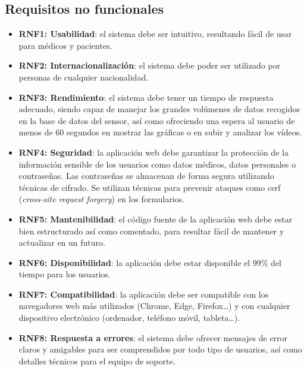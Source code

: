 \subsection{Requisitos no funcionales}
\begin{itemize}
    \item \textbf{RNF1: Usabilidad}: el sistema debe ser intuitivo, resultando fácil de usar para médicos y pacientes. 

    \item \textbf{RNF2: Internacionalización}: el sistema debe poder ser utilizado por personas de cualquier nacionalidad.

    \item \textbf{RNF3: Rendimiento}: el sistema debe tener un tiempo de respuesta adecuado, siendo capaz de manejar los grandes volúmenes de datos recogidos en la base de datos del sensor, así como ofreciendo una espera al usuario de menos de 60 segundos en mostrar las gráficas o en subir y analizar los vídeos.

    \item \textbf{RNF4: Seguridad}: la aplicación web debe garantizar la protección de la información sensible de los usuarios como datos médicos, datos personales o contraseñas. Las contraseñas se almacenan de forma segura utilizando técnicas de cifrado. Se utilizan técnicas para prevenir ataques como csrf (\textit{cross-site request forgery}) en los formularios.

    \item \textbf{RNF5: Mantenibilidad}: el código fuente de la aplicación web debe estar bien estructurado así como comentado, para resultar fácil de mantener y actualizar en un futuro. 

    \item \textbf{RNF6: Disponibilidad}: la aplicación debe estar disponible el 99\% del tiempo para los usuarios.

    \item \textbf{RNF7: Compatibilidad}: la aplicación debe ser compatible con los navegadores web más utilizados (Chrome, Edge, Firefox\ldots) y con cualquier dispositivo electrónico (ordenador, teléfono móvil, tableta\ldots).

    \item \textbf{RNF8: Respuesta a errores}: el sistema debe ofrecer mensajes de error claros y amigables para ser comprendidos por todo tipo de usuarios, así como detalles técnicos para el equipo de soporte.
\end{itemize}


